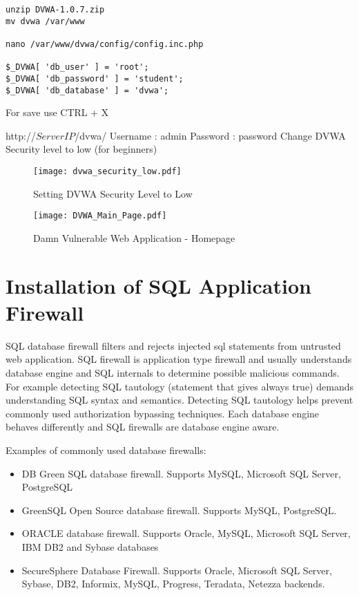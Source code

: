 \begin{verbatim}
unzip DVWA-1.0.7.zip
mv dvwa /var/www

nano /var/www/dvwa/config/config.inc.php

$_DVWA[ 'db_user' ] = 'root';
$_DVWA[ 'db_password' ] = 'student';
$_DVWA[ 'db_database' ] = 'dvwa';
\end{verbatim}
For save use  CTRL + X


http://$ServerIP$/dvwa/
Username : admin
Password : password
Change DVWA Security level to low (for beginners)

\begin{figure}[H] 
 \centering 
 \texttt{[image: dvwa\_security\_low.pdf]} 
 \caption{Setting DVWA Security Level to Low} 
 \label{Setting DVWA Security Level to Low} 
\end{figure}


\begin{figure}[H] 
 \centering 
 \texttt{[image: DVWA\_Main\_Page.pdf]} 
 \caption{Damn Vulnerable Web Application - Homepage} 
 \label{Damn Vulnerable Web Application - Homepage} 
\end{figure}


\section{Installation of SQL Application Firewall}
SQL database firewall filters and rejects injected sql statements from untrusted web application. SQL firewall is application type firewall and usually understands database engine and SQL internals to determine possible malicious commands. For example detecting  SQL tautology (statement that gives always true) demands understanding SQL syntax and semantics. Detecting SQL tautology helps prevent commonly used authorization bypassing techniques.
Each database engine behaves differently and SQL firewalls are database engine aware.


Examples of commonly used database firewalls:
\begin{itemize}
\item DB Green SQL database firewall. Supports MySQL, Microsoft SQL Server, PostgreSQL
\item GreenSQL Open Source database firewall. Supports MySQL, PostgreSQL.
\item ORACLE database firewall. Supports Oracle, MySQL, Microsoft SQL Server, IBM DB2 and Sybase databases
\item SecureSphere Database Firewall. Supports Oracle, Microsoft SQL Server, Sybase, DB2, Informix, MySQL, Progress, Teradata, Netezza backends.
\end{itemize}

